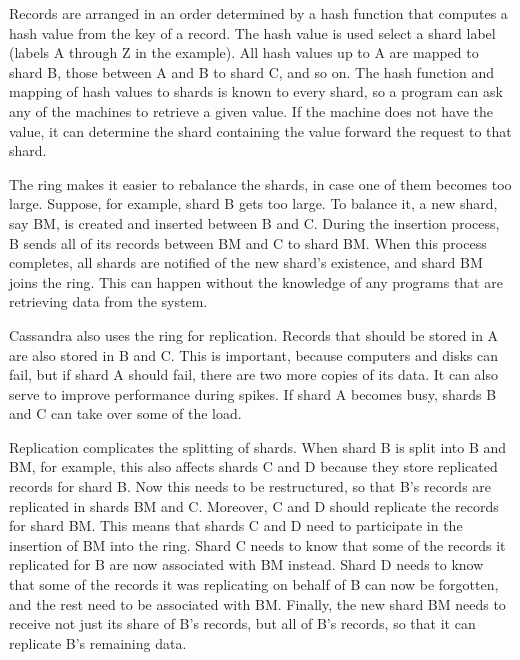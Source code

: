 Records are arranged in an order determined by a hash function
that computes a hash value from the key of a record.
The hash value is used select a shard label (labels A through Z in the example).
All hash values up to A are mapped to shard B,
those between A and B to shard C, and so on.
The hash function and mapping of hash values to shards is known to every shard,
so a program can ask any of the machines to retrieve a given value.
If the machine does not have the value,
it can determine the shard containing the value
forward the request to that shard.

The ring makes it easier to rebalance the shards,
in case one of them becomes too large.
Suppose, for example, shard B gets too large.
To balance it, a new shard, say BM, is created and inserted between B and C.
During the insertion process, B sends all of its records between BM and C to shard BM.
When this process completes, all shards are notified of the new
shard's existence, and shard BM joins the ring.
This can happen without the knowledge of any programs
that are retrieving data from the system.

Cassandra also uses the ring for replication.
Records that should be stored in A
are also stored in B and C.
This is important, because computers and disks can fail,
but if shard A should fail, there are two more copies of its data.
It can also serve to improve performance during spikes.
If shard A becomes busy, shards B and C can take over some of the load.

Replication complicates the splitting of shards.
When shard B is split into B and BM, for example, this also affects shards C and D
because they store replicated records for shard B.
Now this needs to be restructured, so that B's records are replicated in shards BM and C.
Moreover, C and D should replicate the records for shard BM.
This means that shards C and D need
to participate in the insertion of BM into the ring.
Shard C needs to know that some of the records
it replicated for B are now associated with BM instead.
Shard D needs to know that some of the records it was replicating
on behalf of B can now be forgotten, and the rest need to be associated with BM.
Finally, the new shard BM needs to receive not just its share
of B's records, but all of B's records, so that it can replicate B's remaining data.

